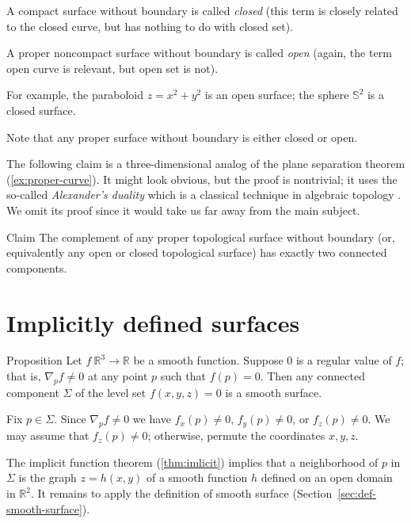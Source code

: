 A compact surface without boundary is called \emph{closed}
(this term is closely related to the closed curve, but has nothing to do with closed set).

A proper noncompact surface without boundary is called \emph{open} (again, the term open curve is relevant, but open set is not).

For example, the paraboloid $z=x^2+y^2$
is an open surface; the 
sphere $\mathbb{S}^2$ is a closed surface.

Note that any proper surface without boundary is either closed or open.

The following claim is a three-dimensional analog of the plane separation theorem (\ref{ex:proper-curve}).
It might look obvious, but the proof is nontrivial; it uses the so-called {}\emph{Alexander's duality} which is a classical technique in algebraic topology \cite[see][]{hatcher}.
We omit its proof since it would take us far away from the main subject.

\begin{thm}{Claim}\label{clm:proper-divides}
The complement of any proper topological surface without boundary (or, equivalently any open or closed topological surface) has exactly two connected components. 
\end{thm}

\section{Implicitly defined surfaces}

\begin{thm}{Proposition}\label{prop:implicit-surface}
Let $f\:\mathbb{R}^3\to \mathbb{R}$ be a smooth function.
Suppose $0$ is a regular value of $f$;
that is, $\nabla_p f\ne 0$ at any point $p$ such that $f(p)=0$.
Then any connected component $\Sigma$ of the level set  $f(x,y,z)=0$ is a smooth surface.
\end{thm}

Fix $p\in\Sigma$.
Since $\nabla_p f\ne 0$ we have 
$f_x(p)\ne 0$,
$f_y(p)\ne 0$, or
$f_z(p)\ne 0$.
We may assume that $f_z(p)\ne 0$;
otherwise, permute the coordinates $x,y,z$.

The implicit function theorem (\ref{thm:imlicit}) implies that a neighborhood of $p$ in $\Sigma$ is the graph $z=h(x,y)$ of a smooth function $h$ defined on an open domain in $\mathbb{R}^2$.
It remains to apply the definition of smooth surface (Section~\ref{sec:def-smooth-surface}).
\qeds

